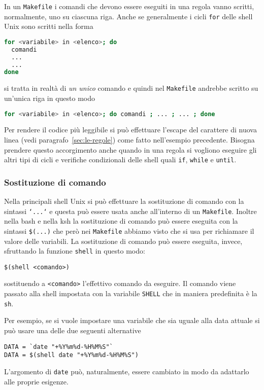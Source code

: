 In un \texttt{Makefile} i comandi che devono essere eseguiti in una regola vanno
scritti, normalmente, uno su ciascuna riga.  Anche se generalmente i cicli
\texttt{for} delle shell Unix sono scritti nella forma
\begin{lstlisting}[language=bash]
for <variabile> in <elenco>; do
  comandi
  ...
  ...
done
\end{lstlisting}
si tratta in realtà di \emph{un unico} comando e quindi nel \texttt{Makefile}
andrebbe scritto su un'unica riga in questo modo
\begin{lstlisting}[language=bash]
for <variabile> in <elenco>; do comandi ; ... ; ... ; done
\end{lstlisting}
Per rendere il codice più leggibile si può effettuare l'escape del carattere di
nuova linea (vedi paragrafo~\ref{sec:le-regole}) come fatto nell'esempio
precedente.  Bisogna prendere questo accorgimento anche quando in una regola si
vogliono eseguire gli altri tipi di cicli e verifiche condizionali delle shell
quali \texttt{if}, \texttt{while} e \texttt{until}.

\subsubsection{Sostituzione di comando}
\label{sec:sostituzione-comando}

Nella principali shell Unix si può effettuare la sostituzione di comando con la
sintassi \texttt{`...`} e questa può essere usata anche all'interno di un
\texttt{Makefile}.  Inoltre nella bash e nella ksh la sostituzione di comando
può essere eseguita con la sintassi \texttt{\$(...)} che però nei
\texttt{Makefile} abbiamo visto che si usa per richiamare il valore delle
variabili.  La sostituzione di comando può essere eseguita, invece, sfruttando
la funzione \texttt{shell} in questo modo:
\begin{lstlisting}
$(shell <comando>)
\end{lstlisting} %
sostituendo a \texttt{<comando>} l'effettivo comando da eseguire.  Il comando
viene passato alla shell impostata con la variabile \texttt{SHELL} che in
maniera predefinita è la \texttt{sh}.

Per esempio, se si vuole impostare una variabile che sia uguale alla data
attuale si può usare una delle due seguenti alternative
\begin{lstlisting}
DATA = `date "+%Y%m%d-%H%M%S"`
DATA = $(shell date "+%Y%m%d-%H%M%S")
\end{lstlisting} %
L'argomento di \texttt{date} può, naturalmente, essere cambiato in modo da
adattarlo alle proprie esigenze.

